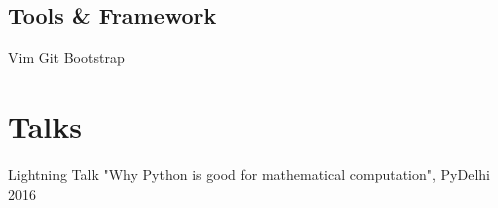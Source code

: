 \documentclass[]{deedy-resume-openfont}
\begin{document}
\begin{minipage}[t]{0.33\textwidth}
\subsection{Tools \& Framework}
\textbullet Vim \textbullet{} Git \textbullet{} Bootstrap
\sectionsep


\section{Talks}
\textbullet{} Lightning Talk "Why Python is good for mathematical computation", PyDelhi 2016 \\
\sectionsep

%
%

\end{minipage}
\hfill
\end{document}
